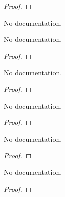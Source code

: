 \begin{proof}
    \leanok
\end{proof}

\begin{definition}\label{strong_quasi}
        \leanok
                No documentation.
    \end{definition}

\begin{theorem}\label{isMinOn_unique}
        \leanok
                No documentation.
    \end{theorem}

\begin{proof}
    \leanok
\end{proof}

\begin{theorem}\label{ContinuousAt_Convergence}
        \leanok
                No documentation.
    \end{theorem}

\begin{proof}
    \leanok
\end{proof}

\begin{theorem}\label{Convergence_ContinuousAt}
        \leanok
                No documentation.
    \end{theorem}

\begin{proof}
    \leanok
\end{proof}

\begin{theorem}\label{ContinuousAt_iff_Convergence}
        \leanok
                No documentation.
    \end{theorem}

\begin{proof}
    \leanok
\end{proof}

\begin{lemma}\label{continuous}
        \leanok
                No documentation.
    \end{lemma}

\begin{proof}
    \leanok
\end{proof}

